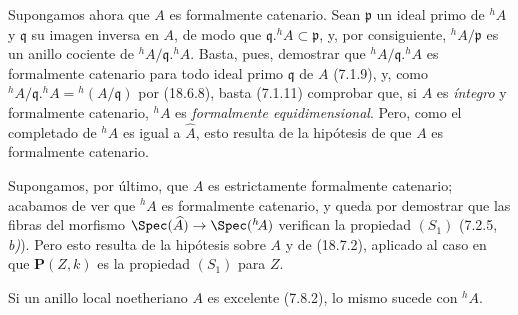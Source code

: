 Supongamos ahora que $A$ es formalmente catenario. Sean $\mathfrak p$ un ideal primo de ${}^h\!A$ y $\mathfrak q$ su imagen inversa en $A$, de modo que $\mathfrak q.{}^h\!A\subset\mathfrak p$, y, por consiguiente, ${}^h\!A/\mathfrak p$ es un anillo cociente de ${}^h\!A/\mathfrak q.{}^h\!A$. Basta, pues, demostrar que ${}^h\!A/\mathfrak q.{}^h\!A$ es formalmente catenario para todo ideal primo $\mathfrak q$ de $A$ (7.1.9), y, como ${}^h\!A/\mathfrak q.{}^h\!A={}^h(A/\mathfrak q)$ por (18.6.8), basta (7.1.11) comprobar que, si $A$ es \emph{íntegro} y formalmente catenario, ${}^h\!A$ es \emph{formalmente equidimensional}. Pero, como el completado de ${}^h\!A$ es igual a $\widehat A$, esto resulta de la hipótesis de que $A$ es formalmente catenario.


Supongamos, por último, que $A$ es estrictamente formalmente catenario; acabamos de ver que ${}^h\!A$ es formalmente catenario, y queda por demostrar que las fibras del morfismo $\Spec(\widehat A)\to\Spec({}^h\!A)$ verifican la propiedad $(S_1)$ (7.2.5, \emph{b)}). Pero esto resulta de la hipótesis sobre $A$ y de (18.7.2), aplicado al caso en que $\boldsymbol P(Z,k)$ es la propiedad $(S_1)$ para $Z$.

\begin{corollary}[18.7.6]
\label{IV.18.7.6}
Si un anillo local noetheriano $A$ es excelente \textup{(7.8.2)}, lo mismo sucede con ${}^h\!A$.
\end{corollary}

